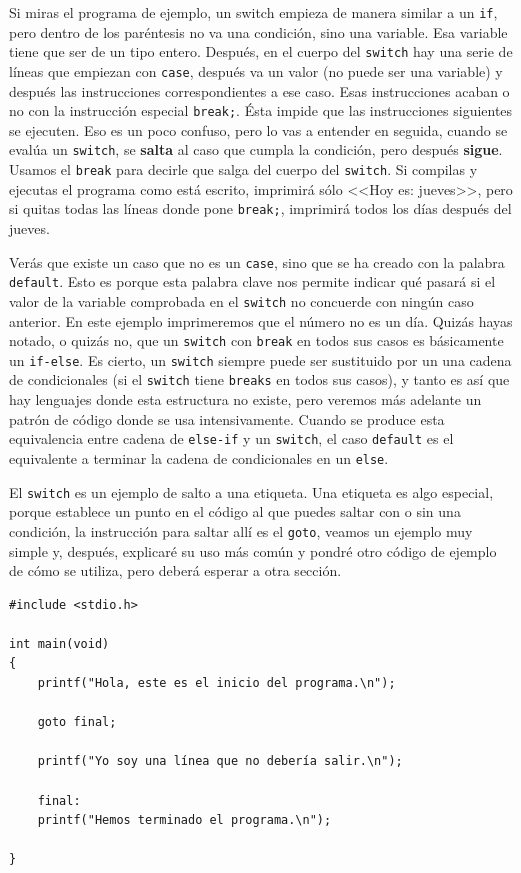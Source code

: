 \documentclass[a4paper]{article}
\begin{document}
Si miras el programa de ejemplo, un switch empieza de manera similar a un
\verb!if!, pero dentro de los paréntesis no va una condición, sino una variable.
Esa variable tiene que ser de un tipo entero. Después, en el cuerpo del
\verb!switch! hay una serie de líneas que empiezan con \verb!case!, después va
un valor (no puede ser una variable) y después las instrucciones
correspondientes a ese caso. Esas instrucciones acaban o no con la instrucción
especial \lstinline[style=C]!break;!. Ésta impide que las
instrucciones siguientes se ejecuten. Eso es un poco confuso, pero lo vas a
entender en seguida, cuando se evalúa un \verb!switch!, se \textbf{salta} al
caso que cumpla la condición, pero después \textbf{sigue}. Usamos el \verb!break!
para decirle que salga del cuerpo del \verb!switch!. Si compilas y ejecutas el
programa como está escrito, imprimirá sólo <<Hoy es: jueves>>, pero si quitas
todas las líneas donde pone \verb!break;!, imprimirá todos los días después del
jueves.

Verás que existe un caso que no es un \verb!case!, sino que se ha creado
con la palabra \verb!default!. Esto es porque esta palabra clave nos permite
indicar qué pasará si el valor de la variable comprobada en el \verb!switch!
no concuerde con ningún caso anterior. En este ejemplo imprimeremos que el
número no es un día.
Quizás hayas notado, o quizás no, que un \verb!switch! con \verb!break! en todos
sus casos es básicamente un \verb!if-else!. Es cierto, un \verb!switch! siempre
puede ser sustituido por un una cadena de condicionales (si el \texttt{switch}
tiene \texttt{breaks} en todos sus casos), y tanto es así que hay
lenguajes donde esta estructura no existe, pero veremos más adelante un patrón
de código donde se usa intensivamente. Cuando se produce esta equivalencia entre
cadena de \verb!else-if! y un \verb!switch!, el caso \verb!default! es el
equivalente a terminar la cadena de condicionales en un \verb!else!.

El \verb!switch! es un ejemplo de salto a una etiqueta. Una etiqueta es algo
especial, porque establece un punto en el código al que puedes saltar con o sin
una condición, la instrucción para saltar allí es el \verb!goto!, veamos un
ejemplo muy simple y, después, explicaré su uso más común y pondré otro código
de ejemplo de cómo se utiliza, pero deberá esperar a otra sección.

\noindent
\begin{minipage}[H]{\linewidth}
\mbox{}
\begin{lstlisting}[style=C,
caption={Ejemplo de programa con un \texttt{goto}},
label={lst:gotoExample}]
#include <stdio.h>

int main(void)
{
    printf("Hola, este es el inicio del programa.\n");

    goto final;

    printf("Yo soy una línea que no debería salir.\n");

    final:
    printf("Hemos terminado el programa.\n");

}
\end{lstlisting}
\end{minipage}
\end{document}

